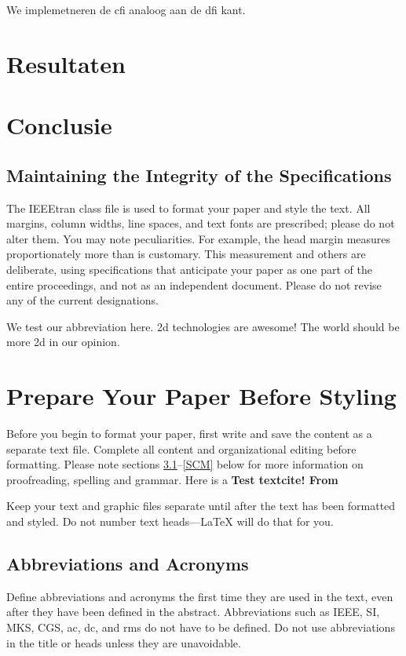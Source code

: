 \documentclass[conference]{IEEEtran}
\begin{document}
We implemetneren de \gls{cfi} analoog aan de \gls{dfi} kant.
\section{Resultaten} 



\section{Conclusie}

\subsection{Maintaining the Integrity of the Specifications}

The IEEEtran class file is used to format your paper and style the text. All margins,
column widths, line spaces, and text fonts are prescribed; please do not
alter them. You may note peculiarities. For example, the head margin
measures proportionately more than is customary. This measurement
and others are deliberate, using specifications that anticipate your paper
as one part of the entire proceedings, and not as an independent document.
Please do not revise any of the current designations.

We test our abbreviation here. \gls{2d} technologies are awesome! The world should be more \gls{2d} in our opinion.
\section{Prepare Your Paper Before Styling}
Before you begin to format your paper, first write and save the content as a
separate text file. Complete all content and organizational editing before
formatting. Please note sections \ref{AA}--\ref{SCM} below for more information on
proofreading, spelling and grammar. Here is a \bf{Test textcite}! From \textcite{b1}

Keep your text and graphic files separate until after the text has been
formatted and styled. Do not number text heads---{\LaTeX} will do that
for you.

\subsection{Abbreviations and Acronyms}\label{AA}
Define abbreviations and acronyms the first time they are used in the text,
even after they have been defined in the abstract. Abbreviations such as
IEEE, SI, MKS, CGS, ac, dc, and rms do not have to be defined. Do not use
abbreviations in the title or heads unless they are unavoidable.
\end{document}

